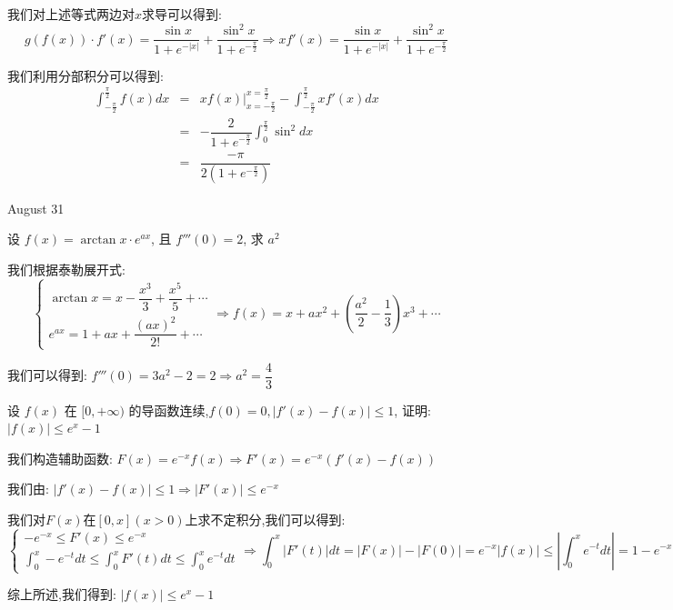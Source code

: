 \begin{solution}

	我们对上述等式两边对$x$求导可以得到:  
	$$g(f(x))\cdot f'(x)=\dfrac{\sin x}{1+e^{-|x|}}+\dfrac{\sin^2 x}{1+e^{-\frac{\pi}{2}}}\Rightarrow xf'(x)=\dfrac{\sin x}{1+e^{-|x|}}+\dfrac{\sin^2 x}{1+e^{-\frac{\pi}{2}}}$$
	
	我们利用分部积分可以得到:  
	\begin{eqnarray*}
		\int_{-\frac{\pi}{2}}^{\frac{\pi}{2}}f(x)dx&=&xf(x)|_{x=-\frac{\pi}{2}}^{x=\frac{\pi}{2}}-\int_{-\frac{\pi}{2}}^{\frac{\pi}{2}}xf'(x)dx\\
		&=&-\dfrac{2}{1+e^{-\frac{\pi}{2}}}\int_{0}^{\frac{\pi}{2}}\sin^2 dx\\
		&=&\dfrac{-\pi}{2(1+e^{-\frac{\pi}{2}})}
	\end{eqnarray*}
\end{solution}


\textcolor{purplea}{August 31}

\begin{example}[][Exam: 34.4.19]
	设 $f(x)=\arctan x \cdot e^{ax}$, 且 $f'''(0)=2$, 求 $a^2$
\end{example}

\begin{solution}

	我们根据泰勒展开式:  
	$$\left\lbrace
	\begin{array}{l}
		\arctan x=x-\dfrac{x^3}{3}+\dfrac{x^5}{5}+\cdots\\
		e^{ax}=1+ax+\dfrac{(ax)^2}{2!}+\cdots
	\end{array}
	\right. \Rightarrow f(x)=x+ax^2+(\dfrac{a^2}{2}-\dfrac{1}{3})x^3+\cdots$$
	
	我们可以得到:  $f'''(0)=3a^2-2=2\Rightarrow a^2=\dfrac{4}{3}$
\end{solution}

\begin{example}[][Exam: 34.4.20]
	设 $f(x)$ 在 $[0,+\infty)$ 的导函数连续,$f(0)=0, \big|f'(x)-f(x)\big|\leq 1$, 证明: $|f(x)|\leq e^x-1$
\end{example}

\begin{solution}

	我们构造辅助函数:  $F(x)=e^{-x}f(x)\Rightarrow F'(x)=e^{-x}(f'(x)-f(x))$
	
	我们由:  $|f'(x)-f(x)|\leq 1\Rightarrow |F'(x)|\leq e^{-x}$
	
	我们对$F(x)$在$[0,x](x>0)$上求不定积分,我们可以得到:  
	$$\left\lbrace
	\begin{array}{l}
		-e^{-x}\leq F'(x)\leq e^{-x}\\
		\int_{0}^{x}-e^{-t}dt\leq\int_{0}^{x}F'(t)dt \leq \int_{0}^{x}e^{-t}dt
	\end{array}
	\right. \Rightarrow\int_{0}^{x}|F'(t)|dt=|F(x)|-|F(0)|=e^{-x}|f(x)|\leq | \int_{0}^{x}e^{-t}dt|=1-e^{-x}$$
	
	综上所述,我们得到:  $|f(x)|\leq e^x-1$
\end{solution}

